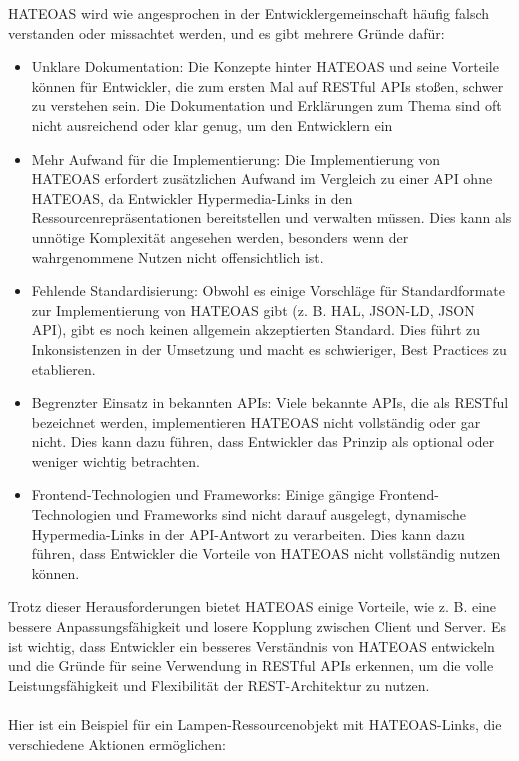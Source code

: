 HATEOAS wird wie angesprochen in der Entwicklergemeinschaft häufig falsch verstanden oder missachtet werden, und es gibt mehrere Gründe dafür:
\begin{itemize}
\item Unklare Dokumentation: Die Konzepte hinter HATEOAS und seine Vorteile können für Entwickler, die zum ersten Mal auf RESTful APIs stoßen, schwer zu verstehen sein. Die Dokumentation und Erklärungen zum Thema sind oft nicht ausreichend oder klar genug, um den Entwicklern ein \item  Mehr Aufwand für die Implementierung: Die Implementierung von HATEOAS erfordert zusätzlichen Aufwand im Vergleich zu einer API ohne HATEOAS, da Entwickler Hypermedia-Links in den Ressourcenrepräsentationen bereitstellen und verwalten müssen. Dies kann als unnötige Komplexität angesehen werden, besonders wenn der wahrgenommene Nutzen nicht offensichtlich ist.
\item  Fehlende Standardisierung: Obwohl es einige Vorschläge für Standardformate zur Implementierung von HATEOAS gibt (z. B. HAL, JSON-LD, JSON API), gibt es noch keinen allgemein akzeptierten Standard. Dies führt zu Inkonsistenzen in der Umsetzung und macht es schwieriger, Best Practices zu etablieren.
\item  Begrenzter Einsatz in bekannten APIs: Viele bekannte APIs, die als RESTful bezeichnet werden, implementieren HATEOAS nicht vollständig oder gar nicht. Dies kann dazu führen, dass Entwickler das Prinzip als optional oder weniger wichtig betrachten.
\item  Frontend-Technologien und Frameworks: Einige gängige Frontend-Technologien und Frameworks sind nicht darauf ausgelegt, dynamische Hypermedia-Links in der API-Antwort zu verarbeiten. Dies kann dazu führen, dass Entwickler die Vorteile von HATEOAS nicht vollständig nutzen können.
\end{itemize}
Trotz dieser Herausforderungen bietet HATEOAS einige Vorteile, wie z. B. eine bessere Anpassungsfähigkeit und losere Kopplung zwischen Client und Server. Es ist wichtig, dass Entwickler ein besseres Verständnis von HATEOAS entwickeln und die Gründe für seine Verwendung in RESTful APIs erkennen, um die volle Leistungsfähigkeit und Flexibilität der REST-Architektur zu nutzen.
\\\\
Hier ist ein Beispiel für ein Lampen-Ressourcenobjekt mit HATEOAS-Links, die verschiedene Aktionen ermöglichen:\\\\

